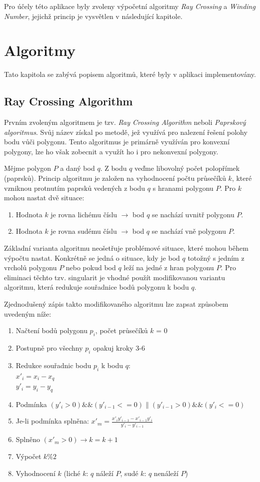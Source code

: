 \documentclass[a4paper, 12pt]{article}
\begin{document}
Pro účely této aplikace byly zvoleny výpočetní algoritmy \textit{Ray Crossing} a \textit{Winding Number}, jejichž princip je vysvětlen v následující kapitole.

\section{Algoritmy}
Tato kapitola se zabývá popisem algoritmů, které byly v aplikaci implementovány. 

\subsection{Ray Crossing Algorithm}
Prvním zvoleným algoritmem je tzv. \textit{Ray Crossing Algorithm} neboli \textit{Paprskový algoritmus}. Svůj název získal po metodě, jež využívá pro nalezení řešení polohy bodu vůči polygonu. Tento algoritmus je primárně využíván pro konvexní polygony, lze ho však zobecnit a využít ho i pro nekonvexní polygony. 

Mějme polygon $P$ a daný bod $q$. Z bodu $q$ veďme libovolný počet polopřímek (paprsků). Princip algoritmu je založen na vyhodnocení počtu průsečíků $k$, které vzniknou protnutím paprsků vedených z bodu $q$ s hranami polygonu $P$. Pro $k$ mohou nastat dvě situace:
\begin{enumerate}
\item Hodnota $k$ je rovna lichému číslu $\rightarrow$ bod $q$ se nachází uvnitř polygonu $P$.
\item Hodnota $k$ je rovna sudému číslu $\rightarrow$ bod $q$ se nachází vně polygonu $P$.
\end{enumerate}

Základní varianta algoritmu neošetřuje problémové situace, které mohou během výpočtu nastat. Konkrétně se jedná o situace, kdy je bod $q$ totožný s jedním z vrcholů polygonu $P$ nebo pokud bod $q$ leží na jedné z hran polygonu $P$. Pro eliminaci těchto tzv. singularit je vhodné použít modifikovanou variantu algoritmu, která redukuje souřadnice bodů polygonu k bodu $q$. 

Zjednodušený zápis takto modifikovaného algoritmu lze zapsat způsobem uvedeným níže:
\begin{enumerate}
\item Načtení bodů polygonu $p_i$, počet průsečíků $k$ = 0
\item Postupně pro všechny $p_i$ opakuj kroky 3-6
\item 	Redukce souřadnic bodu $p_i$ k bodu $q$:\\
$x'_i = x_i - x_q$\\
$y'_i = y_i - y_q$
\item 	Podmínka $(y'_i > 0)\&\&(y'_{i-1} <= 0)\|(y'_{i-1} > 0)\&\&(y'_{i} <= 0)$
\item 	Je-li podmínka splněna: $x'_m = \frac{x'_i y'_{i-1} - x'_{i-1} y'_i}{y'_i - y'_{i-1}}$
\item Splněno $(x'_m > 0) \rightarrow k = k + 1$ 
\item Výpočet $k\%2$
\item Vyhodnocení $k$ (liché $k$: $q$ náleží $P$, sudé $k$: $q$ nenáleží $P$)
\end{enumerate}
\end{document}
